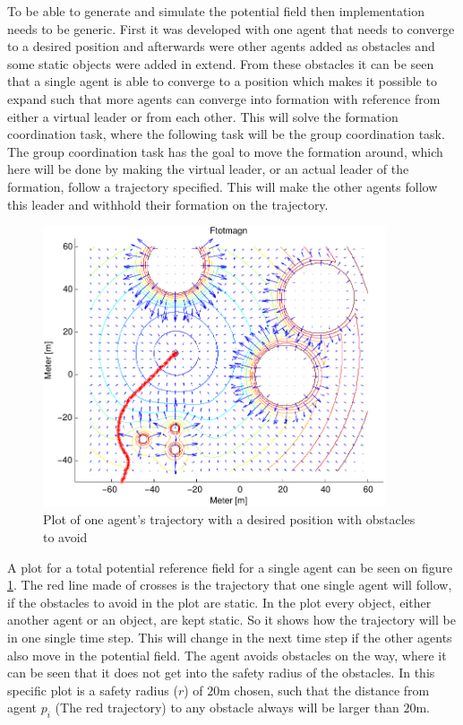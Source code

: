 To be able to generate and simulate the potential field then
implementation needs to be generic. First it was developed with one
agent that needs to converge to a desired position and afterwards were
other agents added as obstacles and some static objects were added in
extend. From these obstacles it can be seen that a single agent is
able to converge to a position which makes it possible to expand such
that more agents can converge into formation with reference from
either a virtual leader or from each other. This will solve the
formation coordination task, where the following task will be the
group coordination task. The group coordination task has the goal to
move the formation around, which here will be done by making the
virtual leader, or an actual leader of the formation, follow a
trajectory specified. This will make the other agents follow this
leader and withhold their formation on the trajectory.
\begin{figure}[htbp]
  \includegraphics[width=0.9\textwidth]{fig/ftotmagnfigpdf1}
  \caption{Plot of one agent's trajectory with a desired position with obstacles to avoid}
  \label{fig:potfieldagenti}
\end{figure}
A plot for a total potential reference field for a single agent can be
seen on figure \ref{fig:potfieldagenti}. The red line made of crosses
is the trajectory that one single agent will follow, if the obstacles
to avoid in the plot are static. In the plot every object, either
another agent or an object, are kept static. So it shows how the
trajectory will be in one single time step. This will change in the
next time step if the other agents also move in the potential field.
The agent avoids obstacles on the way, where it can be seen that it
does not get into the safety radius of the obstacles. In this specific
plot is a safety radius ($r$) of $20$m chosen, such that the distance
from agent $p_i$ (The red trajectory) to any obstacle always will be
larger than $20$m.

